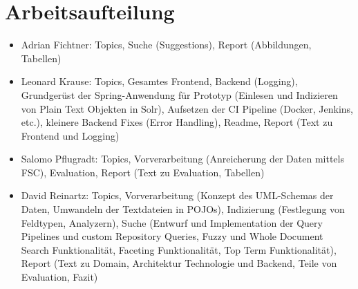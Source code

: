 \documentclass[oneside, a4paper, 12pt, titlepage]{article}
\begin{document}
\vfill

\section{Arbeitsaufteilung}
\begin{itemize}
\item{Adrian Fichtner: Topics, Suche (Suggestions), Report (Abbildungen, Tabellen)}

\item{Leonard Krause: Topics, Gesamtes Frontend, Backend (Logging), Grundgerüst der Spring-Anwendung für Prototyp (Einlesen und Indizieren von Plain Text Objekten in Solr), Aufsetzen der CI Pipeline (Docker, Jenkins, etc.), kleinere Backend Fixes (Error Handling), Readme, Report (Text zu Frontend und Logging)}

\item{Salomo Pflugradt: Topics, Vorverarbeitung (Anreicherung der Daten mittels FSC), Evaluation, Report (Text zu Evaluation, Tabellen)}

\item{David Reinartz: Topics, Vorverarbeitung (Konzept des UML-Schemas der Daten, Umwandeln der Textdateien in POJOs), Indizierung (Festlegung von Feldtypen, Analyzern), Suche (Entwurf und Implementation der Query Pipelines und custom Repository Queries, Fuzzy und Whole Document Search Funktionalität, Faceting Funktionalität, Top Term Funktionalität), Report (Text zu Domain, Architektur Technologie und Backend, Teile von Evaluation, Fazit)}
\end{itemize}
\end{document}
